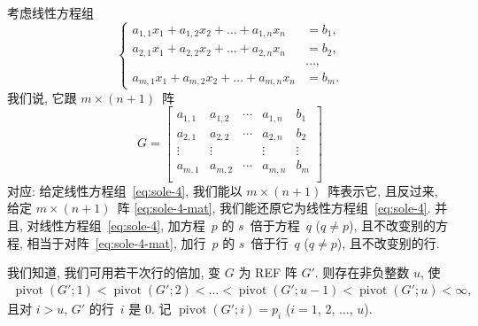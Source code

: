 \documentclass[../libro.tex]{subfiles}
\begin{document}
考虑线性方程组
\begin{equation}
    \left\{ %
    \begin{aligned}
        a_{1,1} x_1 + a_{1,2} x_2 + \dots + a_{1,n} x_n & = b_1, \\
        a_{2,1} x_1 + a_{2,2} x_2 + \dots + a_{2,n} x_n & = b_2, \\
        & \dots, \\
        a_{m,1} x_1 + a_{m,2} x_2 + \dots + a_{m,n} x_n & = b_m.
    \end{aligned}
    \right. %
    \label{eq:sole-4}
\end{equation}
我们说, 它跟 \(m \times (n + 1)\)~阵
\begin{equation}
    G =
    \begin{bmatrix}
        a_{1,1} & a_{1,2} & \cdots & a_{1,n} & b_1    \\
        a_{2,1} & a_{2,2} & \cdots & a_{2,n} & b_2    \\
        \vdots  & \vdots  & {}     & \vdots  & \vdots \\
        a_{m,1} & a_{m,2} & \cdots & a_{m,n} & b_m    \\
    \end{bmatrix}
    \label{eq:sole-4-mat}
\end{equation}
对应:
给定线性方程组~\eqref{eq:sole-4},
我们能以 \(m \times (n + 1)\)~阵表示它,
且反过来, 给定 \(m \times (n + 1)\)~阵 \eqref{eq:sole-4-mat},
我们能还原它为线性方程组~\eqref{eq:sole-4}.
并且, 对线性方程组~\eqref{eq:sole-4},
加方程~\(p\) 的 \(s\)~倍于方程~\(q\) (\(q \neq p\)),
且不改变别的方程,
相当于对阵~\eqref{eq:sole-4-mat},
加行~\(p\) 的 \(s\)~倍于行~\(q\)  (\(q \neq p\)),
且不改变别的行.

我们知道, 我们可用若干次行的倍加,
变 \(G\) 为 REF 阵 \(G'\).
则存在非负整数 \(u\), 使
\begin{align*}
    \operatorname{pivot} {(G'; 1)}
    < \operatorname{pivot} {(G'; 2)}
    < \dots
    < \operatorname{pivot} {(G'; u-1)}
    < \operatorname{pivot} {(G'; u)}
    < \infty,
\end{align*}
且对 \(i > u\),
\(G'\) 的行~\(i\) 是 \(0\).
记 \(\operatorname{pivot} {(G'; i)} = p_i\)
(\(i = 1\), \(2\), \(\dots\), \(u\)).
\end{document}
